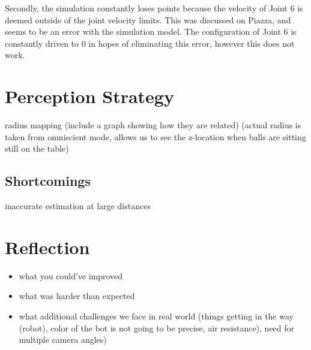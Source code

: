 \documentclass{article}
\begin{document}
Secondly, the simulation constantly loses points because the velocity of Joint 6 is deemed outside of the joint velocity limits. This was discussed on Piazza, and seems to be an error with the simulation model. The configuration of Joint 6 is constantly driven to 0 in hopes of eliminating this error, however this does not work.


\section{Perception Strategy} \label{sec:perception}
radius mapping (include a graph showing how they are related) (actual radius is taken from omniscient mode, allows us to see the z-location when balls are sitting still on the table)


\subsection{Shortcomings} \label{sec:short_perc}
inaccurate estimation at large distances


\section{Reflection}
\begin{itemize}
\item what you could've improved
\item what was harder than expected
\item what additional challenges we face in real world (things getting in the way (robot), color of the bot is not going to be precise, air resistance), need for multiple camera angles)
\end{itemize}
\end{document}
